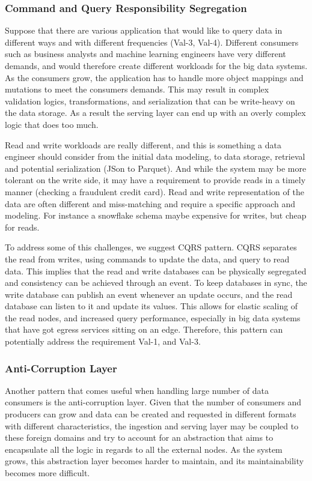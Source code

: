 \documentclass[conference]{IEEEtran}
\begin{document}
\subsubsection{Command and Query Responsibility Segregation}

Suppose that there are various application that would like to query data in different ways and with different frequencies (Val-3, Val-4). Different consumers such as business analysts and machine learning engineers have very different demands, and would therefore create different workloads for the big data systems. As the consumers grow, the application has to handle more object mappings and mutations to meet the consumers demands. This may result in complex validation logics, transformations, and serialization that can be write-heavy on the data storage. As a result the serving layer can end up with an overly complex logic that does too much. 

Read and write workloads are really different, and this is something a data engineer should consider from the initial data modeling, to data storage, retrieval and potential serialization (JSon to Parquet). And while the system may be more tolerant on the write side, it may have a requirement to provide reads in a timely manner (checking a fraudulent credit card). Read and write representation of the data are often different and miss-matching and require a specific approach and modeling. For instance a snowflake schema maybe expensive for writes, but cheap for reads. 

To address some of this challenges, we suggest CQRS pattern. CQRS separates the read from writes, using commands to update the data, and query to read data. This implies that the read and write databases can be physically segregated and consistency can be achieved through an event. To keep databases in sync, the write database can publish an event whenever an update occurs, and the read database can listen to it and update its values. This allows for elastic scaling of the read nodes, and increased query performance, especially in big data systems that have got egress services sitting on an edge. Therefore, this pattern can potentially address the requirement Val-1, and Val-3. 

\subsubsection{Anti-Corruption Layer}

Another pattern that comes useful when handling large number of data consumers is the anti-corruption layer. Given that the number of consumers and producers can grow and data can be created and requested in different formats with different characteristics, the ingestion and serving layer may be coupled to these foreign domains and try to account for an abstraction that aims to encapsulate all the logic in regards to all the external nodes. As the system grows, this abstraction layer becomes harder to maintain, and its maintainability becomes more difficult. 
\end{document}

